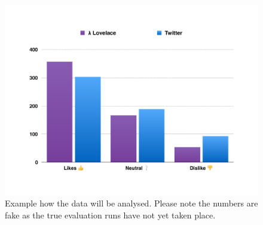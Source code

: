 \documentclass{article}
\begin{document}
\begin{figure}[H]
    \includegraphics[width=1\textwidth, center]{sample_graph}
    \caption{Example how the data will be analysed. Please note the numbers are fake as the true evaluation runs have not yet taken place.}
\end{figure}
\end{document}
